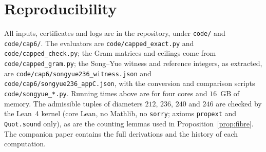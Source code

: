 \section{Reproducibility}
All inputs, certificates and logs are in the repository, under
\texttt{code/} and \texttt{code/cap6/}. The evaluators are
\texttt{code/capped\_exact.py} and \texttt{code/capped\_check.py}; the Gram
matrices and ceilings come from \texttt{code/capped\_gram.py}; the Song--Yue
witness and reference integers, as extracted, are
\texttt{code/cap6/songyue236\_witness.json} and
\texttt{code/cap6/songyue236\_appC.json}, with the conversion and comparison
scripts \texttt{code/songyue\_*.py}. Running times above are for four cores
and $16$~GB of memory. The admissible tuples of diameters $212$, $236$, $240$
and $246$ are checked by the Lean~4 kernel (core Lean, no Mathlib, no
\texttt{sorry}; axioms \texttt{propext} and \texttt{Quot.sound} only), as are
the counting lemmas used in Proposition~\ref{prop:fibre}. The companion paper
\cite{Kim26} contains the full derivations and the history of each
computation.

